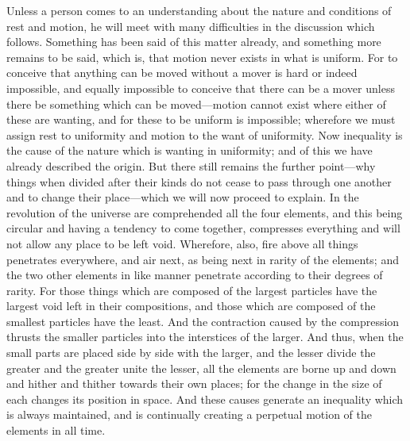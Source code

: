\documentclass[11pt,letter]{article}
\begin{document}
\par  Unless a person comes to an understanding about the nature and conditions of rest and motion, he will meet with many difficulties in the discussion which follows. Something has been said of this matter already, and something more remains to be said, which is, that motion never exists in what is uniform. For to conceive that anything can be moved without a mover is hard or indeed impossible, and equally impossible to conceive that there can be a mover unless there be something which can be moved—motion cannot exist where either of these are wanting, and for these to be uniform is impossible; wherefore we must assign rest to uniformity and motion to the want of uniformity. Now inequality is the cause of the nature which is wanting in uniformity; and of this we have already described the origin. But there still remains the further point—why things when divided after their kinds do not cease to pass through one another and to change their place—which we will now proceed to explain. In the revolution of the universe are comprehended all the four elements, and this being circular and having a tendency to come together, compresses everything and will not allow any place to be left void. Wherefore, also, fire above all things penetrates everywhere, and air next, as being next in rarity of the elements; and the two other elements in like manner penetrate according to their degrees of rarity. For those things which are composed of the largest particles have the largest void left in their compositions, and those which are composed of the smallest particles have the least. And the contraction caused by the compression thrusts the smaller particles into the interstices of the larger. And thus, when the small parts are placed side by side with the larger, and the lesser divide the greater and the greater unite the lesser, all the elements are borne up and down and hither and thither towards their own places; for the change in the size of each changes its position in space. And these causes generate an inequality which is always maintained, and is continually creating a perpetual motion of the elements in all time.
\end{document}
